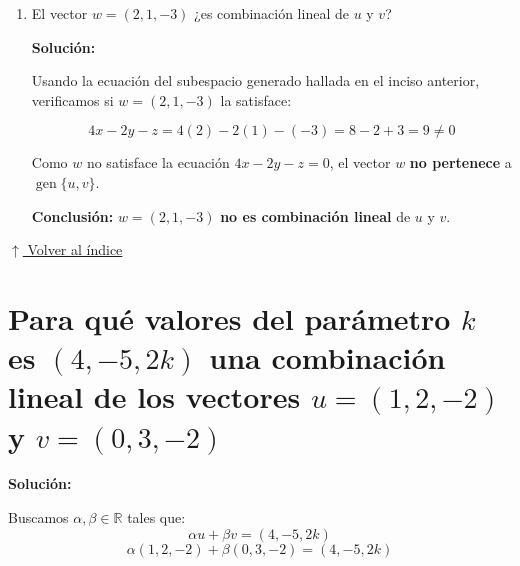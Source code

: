 \documentclass[12pt]{article}
\newcommand{\solucion}{%
    \vspace{0.8em}%
    \textbf{Solución:}%
    \vspace{0.8em}%
}
\newcommand{\volverindice}{%
    \vspace{1em}%
    \begin{flushright}%
        \hyperlink{indice}{\small $\uparrow$ Volver al índice}%
    \end{flushright}%
}
\begin{document}
\begin{enumerate}[label=\alph*.-]
    \textbf{Paso 3:} $F_3 \to F_3 + 2F_2$

    \[
    \left(\begin{array}{cc|c}
    1 & 0 & x \\
    0 & 1 & y-3x \\
    0 & 0 & z+2x+2(y-3x)
    \end{array}\right)
    =
    \left(\begin{array}{cc|c}
    1 & 0 & x \\
    0 & 1 & y-3x \\
    0 & 0 & z-4x+2y
    \end{array}\right)
    \]

    La tercera fila quedó con ceros en las columnas de $\alpha$ y $\beta$. Para que el sistema tenga solución, el término del lado derecho de esa fila debe ser cero:
    \[
    z-4x+2y = 0
    \]

    \textbf{Conclusión:}
    \[
    \operatorname{gen}\{u,v\} = \{(x,y,z)\in\mathbb{R}^3 \; / \; 4x-2y-z=0\}
    \]

    \item El vector $w = (2,1,-3)$ ¿es combinación lineal de $u$ y $v$?

    \solucion

    Usando la ecuación del subespacio generado hallada en el inciso anterior, verificamos si $w=(2,1,-3)$ la satisface:

    \[
    4x-2y-z = 4(2)-2(1)-(-3) = 8-2+3 = 9 \neq 0
    \]

    Como $w$ no satisface la ecuación $4x-2y-z=0$, el vector $w$ \textbf{no pertenece} a $\operatorname{gen}\{u,v\}$.

    \textbf{Conclusión:} $w=(2,1,-3)$ \textbf{no es combinación lineal} de $u$ y $v$.

\end{enumerate}

\volverindice
\newpage

\section{Para qué valores del parámetro $k$ es $(4,-5,2k)$ una combinación lineal de los vectores $u = (1,2,-2)$ y $v = (0,3,-2)$}

\solucion

Buscamos $\alpha,\beta \in \mathbb{R}$ tales que:
\[
\alpha u + \beta v = (4,-5,2k)
\]
\[
\alpha(1,2,-2)+\beta(0,3,-2) = (4,-5,2k)
\]
\end{document}
